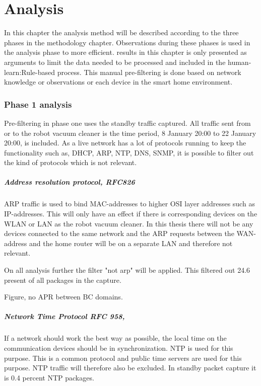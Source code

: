 \chapter{Analysis}
In this chapter the analysis method will be described according to the three phases in the methodology chapter. Observations during these phases is used in the analysis phase to more efficient. results in this chapter is only presented as arguments to limit the data needed to be processed and included in the human-learn:Rule-based process. This manual pre-filtering is done based on network knowledge or observations or each device in the smart home environment.

\subsection{Phase 1 analysis}
Pre-filtering in phase one uses the standby traffic captured. All traffic sent from or to the robot vacuum cleaner is the time period, 8 January 20:00 to 22 January 20:00, is included. As a live network has a lot of protocols running to keep the functionality such as, DHCP, ARP, NTP, DNS, SNMP, it is possible to filter out the kind of protocols which is not relevant. 

\paragraph{Address resolution protocol, RFC826}
ARP traffic is used to bind MAC-addresses to higher OSI layer addresses such as IP-addresses. This will only have an effect if there is corresponding devices on the WLAN or LAN as the robot vacuum cleaner. In this thesis there will not be any devices connected to the same network and the ARP requests between the WAN-address and the home router will be on a separate LAN and therefore not relevant.\cite{rfc826}

On all analysis further the filter "not arp" will be applied. This filtered out 24.6 present of all packages in the capture.  

Figure, no APR between BC domains.

\paragraph{Network Time Protocol RFC 958,}
If a network should work the best way as possible, the local time on the communication devices should be in synchronization. NTP is used for this purpose. This is a common protocol and public time servers are used for this purpose. NTP traffic will therefore also be excluded. In standby packet capture it is 0.4 percent NTP packages.\cite{rfc958_ntp}

